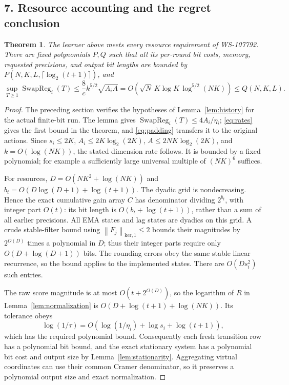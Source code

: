 \documentclass[11pt]{article}
\newcommand{\SwapReg}{\operatorname{SwapReg}}
\newcommand{\norm}[1]{\left\lVert#1\right\rVert}
\newtheorem{theorem}{Theorem}
\begin{document}
\subsection*{7. Resource accounting and the regret conclusion}
\begin{theorem}\label{thm:transfer}
The learner above meets every resource requirement of WS-107792.
There are fixed polynomials $P,Q$
such that all its per-round bit costs, memory, requested precisions,
and output bit lengths are bounded by
$P(N,K,L,\lceil\log_2(t+1)\rceil)$, and
\[
 \sup_{T\geq1}\SwapReg_i(T)
 \leq\frac{8}{c}k^{5/2}\sqrt{A_iA}
 =O\!\left(\sqrt N\,K\log K\,\log^{5/2}(NK)\right)
 \leq Q(N,K,L).
\]
\end{theorem}
\begin{proof}
The preceding section verifies the hypotheses of Lemma~\ref{lem:history}
for the actual finite-bit run.  The lemma gives
$\SwapReg_i(T)\leq4A_i/\eta_i$;
\eqref{eq:rates} gives the first bound in the theorem, and
\eqref{eq:padding} transfers it to the original actions.
Since $s_i\leq2K$, $A_i\leq2K\log_2(2K)$,
$A\leq2NK\log_2(2K)$, and $k=O(\log(NK))$, the stated dimension
rate follows.  It is bounded by a fixed polynomial; for example a
sufficiently large universal multiple of $(NK)^6$ suffices.

For resources, $D=O(NK^2+\log(NK))$ and
$b_t=O(D\log(D+1)+\log(t+1))$.
The dyadic grid is nondecreasing.  Hence the exact cumulative gain
array $C$ has denominator dividing $2^{b_t}$, with integer part
$O(t)$: its bit length is $O(b_t+\log(t+1))$, rather than a sum of
all earlier precisions.  All EMA states and lag states are dyadics
on this grid.  A crude stable-filter bound using
$\norm{F_j}_{\mathrm{ker},1}\leq2$ bounds their magnitudes by
$2^{O(D)}$ times a polynomial in $D$; thus their integer parts require
only $O(D+\log(D+1))$ bits.  The rounding errors obey the same stable
linear recurrence, so the bound applies to the implemented states.
There are $O(Ds_i^2)$ such entries.

The raw score magnitude is at most $O(t+2^{O(D)})$, so the logarithm
of $R$ in Lemma~\ref{lem:normalization} is
$O(D+\log(t+1)+\log(NK))$.  Its tolerance obeys
\[
 \log(1/\tau)=O(\log(1/\eta_i)+\log s_i+\log(t+1)),
\]
which has the required polynomial bound.  Consequently each fresh
transition row has a polynomial bit bound, and the exact stationary
system has a polynomial bit cost and output size by
Lemma~\ref{lem:stationarity}.  Aggregating virtual coordinates can
use their common Cramer denominator, so it preserves a polynomial
output size and exact normalization.


\end{proof}
\end{document}
